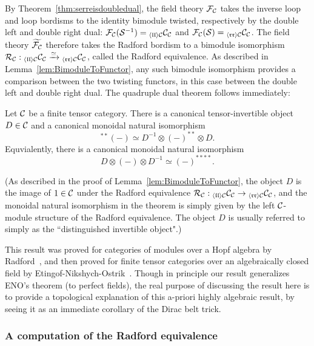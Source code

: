 \documentclass{amsart}
\begin{document}
By Theorem~\ref{thm:serreisdoubledual}, the field theory $\mathcal F_\mathcal C$ takes the inverse loop and loop bordisms to the identity bimodule twisted, respectively by the double left and double right dual: $\mathcal F_\mathcal C(\mathcal S^{-1}) = {}_{\langle \mathfrak{l l} \rangle \mathcal C} \mathcal C_\mathcal C$ and $\mathcal F_\mathcal C(\mathcal S) = {}_{\langle \mathfrak{r r} \rangle \mathcal C} \mathcal C_\mathcal C$.  The field theory $\widetilde{\mathcal F_\mathcal C}$ therefore takes the Radford bordism to a bimodule isomorphism $\mathcal R_\mathcal C : {}_{\langle \mathfrak{l l} \rangle \mathcal C} \mathcal C_\mathcal C \xrightarrow{\simeq} {}_{\langle \mathfrak{r r} \rangle \mathcal C} \mathcal C_\mathcal C$, called the Radford equivalence.  As described in Lemma~\ref{lem:BimoduleToFunctor}, any such bimodule isomorphism provides a comparison between the two twisting functors, in this case between the double left and double right dual.  The quadruple dual theorem follows immediately:
\begin{theorem} \label{thm:quaddual}
Let $\mathcal C$ be a finite tensor category.  There is a canonical tensor-invertible object $D \in \mathcal C$ and a canonical monoidal natural isomorphism
\[
{}^{**}(-) \simeq D^{-1} \otimes (-)^{**} \otimes D.
\]
Equvialently, there is a canonical monoidal natural isomorphism
\[
D \otimes (-) \otimes D^{-1} \simeq (-)^{****}.
\] 
\end{theorem}
\nid (As described in the proof of Lemma~\ref{lem:BimoduleToFunctor}, the object $D$ is the image of $1 \in \mathcal C$ under the Radford equivalence $\mathcal R_\mathcal C : {}_{\langle \mathfrak{l l} \rangle \mathcal C} \mathcal C_\mathcal C \rightarrow {}_{\langle \mathfrak{r r} \rangle \mathcal C} \mathcal C_\mathcal C$, and the monoidal natural isomorphism in the theorem is simply given by the left $\mathcal C$-module structure of the Radford equivalence.  The object $D$ is usually referred to simply as the ``distinguished invertible object".)

This result was proved for categories of modules over a Hopf algebra by Radford~\cite{MR0407069}, and then proved for finite tensor categories over an algebraically closed field by Etingof-Nikshych-Ostrik~\cite{MR2097289}.  Though in principle our result generalizes ENO's theorem (to perfect fields), the real purpose of discussing the result here is to provide a topological explanation of this a-priori highly algebraic result, by seeing it as an immediate corollary of the Dirac belt trick.

\subsubsection{A computation of the Radford equivalence} \label{sec:computeradford}
\end{document}

